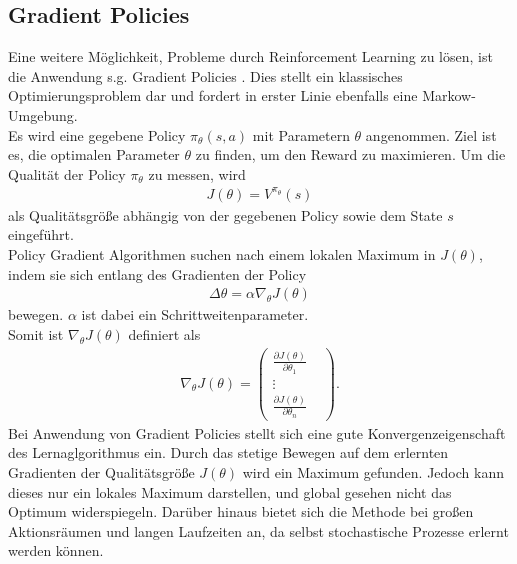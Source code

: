 	\subsection{Gradient Policies}
		Eine weitere Möglichkeit, Probleme durch Reinforcement Learning zu lösen, ist die Anwendung s.g. \grqq Gradient Policies \glqq{}. Dies stellt ein klassisches Optimierungsproblem dar und fordert in erster Linie ebenfalls eine Markow-Umgebung.\\
		Es wird eine gegebene Policy $\pi_\theta(s,a)$ mit Parametern $\theta$ angenommen. Ziel ist es, die optimalen Parameter $\theta$ zu finden, um den Reward zu maximieren. Um die Qualität der Policy $\pi_\theta$ zu messen, wird
		\begin{align}
			J(\theta) = V^{\pi_\theta}(s)
		\end{align}
		als Qualitätsgröße abhängig von der gegebenen Policy sowie dem State $s$ eingeführt.\\
		Policy Gradient Algorithmen suchen nach einem lokalen Maximum in $J(\theta)$, indem sie sich entlang des Gradienten der Policy 
		\begin{align}
			\Delta \theta = \alpha \nabla_\theta J(\theta)
		\end{align}
		bewegen. $\alpha$ ist dabei ein Schrittweitenparameter.\\
		Somit ist $\nabla_\theta J(\theta)$ definiert als
		\begin{align}
			\nabla_\theta J(\theta) = \begin{pmatrix}
			\frac{\partial J(\theta)}{\partial \theta_1} & \\
			\vdots & \\
			\frac{\partial J(\theta)}{\partial \theta_n} & \end{pmatrix}.
		\end{align}
		Bei Anwendung von Gradient Policies stellt sich eine gute Konvergenzeigenschaft des Lernaglgorithmus ein. Durch das stetige Bewegen auf dem erlernten Gradienten der Qualitätsgröße $J(\theta)$ wird ein Maximum gefunden. Jedoch kann dieses nur ein lokales Maximum darstellen, und global gesehen nicht das Optimum widerspiegeln. Darüber hinaus bietet sich die Methode bei großen Aktionsräumen und langen Laufzeiten an, da selbst stochastische Prozesse erlernt werden können. 
